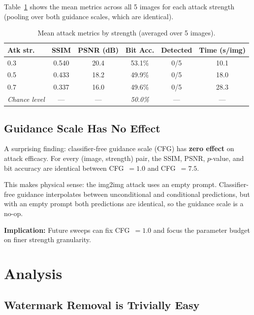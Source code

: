 \documentclass[11pt,a4paper]{article}
\begin{document}
Table~\ref{tab:summary} shows the mean metrics across all 5 images for
each attack strength (pooling over both guidance scales, which are
identical).

\begin{table}[h]
\centering
\caption{Mean attack metrics by strength (averaged over 5 images).}
\label{tab:summary}
\begin{tabular}{lccccc}
\toprule
\textbf{Atk str.} & \textbf{SSIM} & \textbf{PSNR (dB)} & \textbf{Bit Acc.} & \textbf{Detected} & \textbf{Time (s/img)} \\
\midrule
0.3 & 0.540 & 20.4 & 53.1\% & 0/5 & 10.1 \\
0.5 & 0.433 & 18.2 & 49.9\% & 0/5 & 18.0 \\
0.7 & 0.337 & 16.0 & 49.6\% & 0/5 & 28.3 \\
\midrule
\textit{Chance level} & --- & --- & \textit{50.0\%} & --- & --- \\
\bottomrule
\end{tabular}
\end{table}

\subsection{Guidance Scale Has No Effect}
\label{sec:guidance}

A surprising finding: classifier-free guidance scale (CFG) has
\textbf{zero effect} on attack efficacy. For every (image, strength) pair,
the SSIM, PSNR, $p$-value, and bit accuracy are identical between
CFG~$= 1.0$ and CFG~$= 7.5$.

This makes physical sense: the img2img attack uses an empty prompt.
Classifier-free guidance interpolates between unconditional and
conditional predictions, but with an empty prompt both predictions are
identical, so the guidance scale is a no-op.

\textbf{Implication:} Future sweeps can fix CFG~$= 1.0$ and focus
the parameter budget on finer strength granularity.

\section{Analysis}
\label{sec:analysis}

\subsection{Watermark Removal is Trivially Easy}
\end{document}
